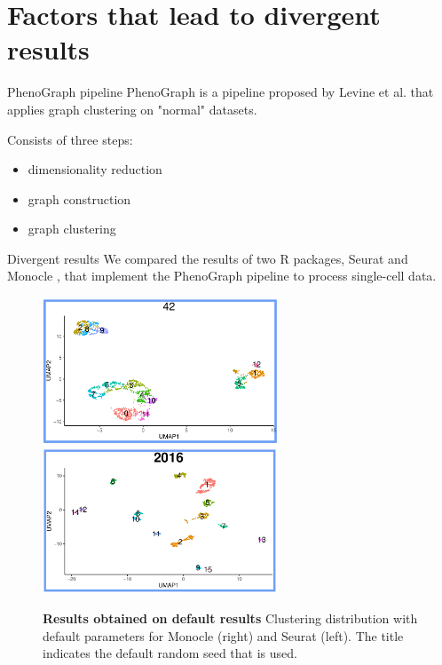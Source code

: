 \section{Factors that lead to divergent results}

\begin{frame}{PhenoGraph pipeline}
    PhenoGraph is a pipeline proposed by Levine et al. \cite{Levine2015} that applies graph clustering on "normal" datasets.

    \bigskip

    Consists of three steps:
    \begin{itemize}[<+->]
        \item dimensionality reduction
        \item graph construction
        \item graph clustering
    \end{itemize}
    
\end{frame}

\begin{frame}{Divergent results}
    We compared the results of two R packages, Seurat \cite{Hao2021} and Monocle \cite{Cao2019}, that implement the PhenoGraph pipeline to process single-cell data.

    \begin{figure}[H]
    \centering
    \includegraphics[width=7cm]{images/ch2/2_S1.png}
    \includegraphics[width=7cm]{images/ch2/2_M1.png}
    \caption{\textbf{Results obtained on default results} Clustering distribution with default parameters for Monocle (right) and Seurat
(left). The title indicates the default random seed that is used.}
\end{figure}
\end{frame}

